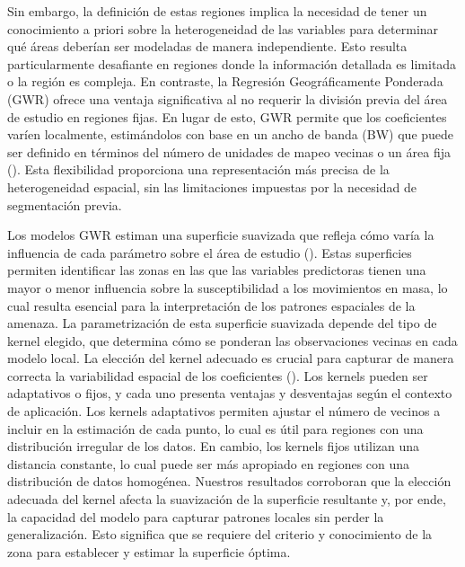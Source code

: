 \documentclass[
  manuscript=article,  
  layout=preprint,  
]{format}
\begin{document}
Sin embargo, la definición de estas regiones implica la necesidad de tener un conocimiento a priori sobre la heterogeneidad de las variables para determinar qué áreas deberían ser modeladas de manera independiente. Esto resulta particularmente desafiante en regiones donde la información detallada es limitada o la región es compleja. En contraste, la Regresión Geográficamente Ponderada (GWR) ofrece una ventaja significativa al no requerir la división previa del área de estudio en regiones fijas. En lugar de esto, GWR permite que los coeficientes varíen localmente, estimándolos con base en un ancho de banda (BW) que puede ser definido en términos del número de unidades de mapeo vecinas o un área fija (\cite{brunsdon1996geographically}). Esta flexibilidad proporciona una representación más precisa de la heterogeneidad espacial, sin las limitaciones impuestas por la necesidad de segmentación previa.

Los modelos GWR estiman una superficie suavizada que refleja cómo varía la influencia de cada parámetro sobre el área de estudio (\cite{fotheringham2009geographically}). Estas superficies permiten identificar las zonas en las que las variables predictoras tienen una mayor o menor influencia sobre la susceptibilidad a los movimientos en masa, lo cual resulta esencial para la interpretación de los patrones espaciales de la amenaza. La parametrización de esta superficie suavizada depende del tipo de kernel elegido, que determina cómo se ponderan las observaciones vecinas en cada modelo local. La elección del kernel adecuado es crucial para capturar de manera correcta la variabilidad espacial de los coeficientes (\cite{guo2008comparison}). Los kernels pueden ser adaptativos o fijos, y cada uno presenta ventajas y desventajas según el contexto de aplicación. Los kernels adaptativos permiten ajustar el número de vecinos a incluir en la estimación de cada punto, lo cual es útil para regiones con una distribución irregular de los datos. En cambio, los kernels fijos utilizan una distancia constante, lo cual puede ser más apropiado en regiones con una distribución de datos homogénea. Nuestros resultados corroboran que la elección adecuada del kernel afecta la suavización de la superficie resultante y, por ende, la capacidad del modelo para capturar patrones locales sin perder la generalización. Esto significa que se requiere del criterio y conocimiento de la zona para establecer y estimar la superficie óptima.
\end{document}
